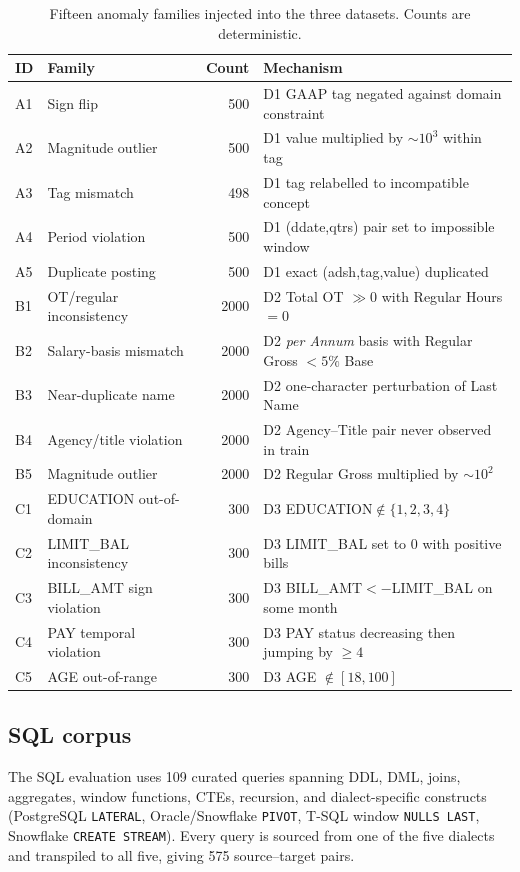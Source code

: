 \documentclass{ieeeaccess}
\begin{document}
\begin{table}[!htbp]
\centering
\small
\caption{Fifteen anomaly families injected into the three datasets. Counts are deterministic.}
\label{tab:families}
\begin{tabular}{@{}llrl@{}}
\toprule
ID & Family & Count & Mechanism \\
\midrule
A1 & Sign flip                    &  500 & D1 GAAP tag negated against domain constraint \\
A2 & Magnitude outlier            &  500 & D1 value multiplied by $\sim 10^3$ within tag \\
A3 & Tag mismatch                 &  498 & D1 tag relabelled to incompatible concept \\
A4 & Period violation             &  500 & D1 (ddate,qtrs) pair set to impossible window \\
A5 & Duplicate posting            &  500 & D1 exact (adsh,tag,value) duplicated \\
\midrule
B1 & OT/regular inconsistency     & \num{2000} & D2 Total OT $\gg 0$ with Regular Hours $=0$ \\
B2 & Salary-basis mismatch        & \num{2000} & D2 \emph{per Annum} basis with Regular Gross $<5\%$ Base \\
B3 & Near-duplicate name          & \num{2000} & D2 one-character perturbation of Last Name \\
B4 & Agency/title violation       & \num{2000} & D2 Agency--Title pair never observed in train \\
B5 & Magnitude outlier            & \num{2000} & D2 Regular Gross multiplied by $\sim 10^2$ \\
\midrule
C1 & EDUCATION out-of-domain      &  300 & D3 EDUCATION$\notin\{1,2,3,4\}$ \\
C2 & LIMIT\_BAL inconsistency     &  300 & D3 LIMIT\_BAL set to 0 with positive bills \\
C3 & BILL\_AMT sign violation     &  300 & D3 BILL\_AMT$<-$LIMIT\_BAL on some month \\
C4 & PAY temporal violation       &  300 & D3 PAY status decreasing then jumping by $\ge 4$ \\
C5 & AGE out-of-range             &  300 & D3 AGE $\notin [18, 100]$ \\
\bottomrule
\end{tabular}
\end{table}

\FloatBarrier

\subsection{SQL corpus}
The SQL evaluation uses \num{109} curated queries spanning DDL, DML, joins, aggregates, window functions,
CTEs, recursion, and dialect-specific constructs (PostgreSQL \texttt{LATERAL}, Oracle/Snowflake
\texttt{PIVOT}, T-SQL window \texttt{NULLS LAST}, Snowflake \texttt{CREATE STREAM}). Every query is
sourced from one of the five dialects and transpiled to all five, giving \num{575} source--target pairs.
\end{document}

